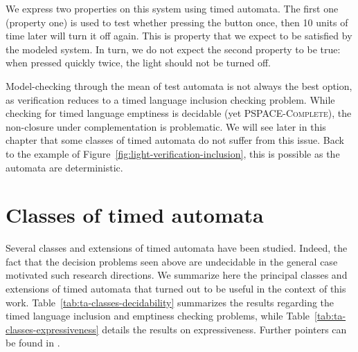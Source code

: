 We express two properties on this system using timed automata. The first one (property one) is used to test whether pressing the button once, then 10 units of time later will turn it off again. This is property that we expect to be satisfied by the modeled system. In turn, we do not expect the second property to be true: when pressed quickly twice, the light should not be turned off.

Model-checking through the mean of test automata is not always the best option, as verification reduces to a timed language inclusion checking problem. While checking for timed language emptiness is decidable (yet \textsc{PSPACE-Complete}), the non-closure under complementation is problematic. We will see later in this chapter that some classes of timed automata do not suffer from this issue. Back to the example of Figure~\ref{fig:light-verification-inclusion}, this is possible as the automata are deterministic.


\section{Classes of timed automata}


Several classes and extensions of timed automata have been studied. Indeed, the fact that the decision problems seen above are undecidable in the general case motivated such research directions. We summarize here the principal classes and extensions of timed automata that turned out to be useful in the context of this work.
%
Table~\ref{tab:ta-classes-decidability} summarizes the results regarding the timed language inclusion and emptiness checking problems, while Table~\ref{tab:ta-classes-expressiveness} details the results on expressiveness.
%
Further pointers can be found in \cite{RAPM04,RA98,ST03,JOJW04,BL-VAT06}.

